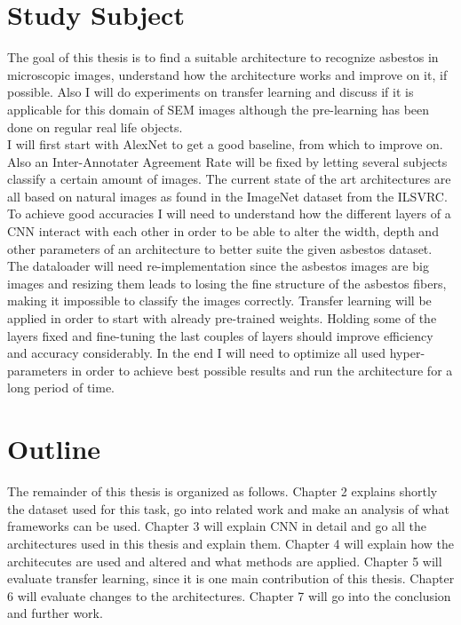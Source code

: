 \section{Study Subject}

The goal of this thesis is to find a suitable architecture to recognize asbestos in microscopic images, understand how the architecture works and improve on it, if possible. Also I will do experiments on transfer learning and discuss if it is applicable for this domain of SEM images although the pre-learning has been done on regular real life objects. \\

I will first start with AlexNet to get a good baseline, from which to improve on. Also an Inter-Annotater Agreement Rate will be fixed by letting several subjects classify a certain amount of images. The current state of the art architectures are all based on natural images as found in the ImageNet dataset from the ILSVRC. To achieve good accuracies I will need to understand how the different layers of a CNN interact with each other in order to be able to alter the width, depth and other parameters of an architecture to better suite the given asbestos dataset. The dataloader will need re-implementation since the asbestos images are big images and resizing them leads to losing the fine structure of the asbestos fibers, making it impossible to classify the images correctly. Transfer learning will be applied in order to start with already pre-trained weights. Holding some of the layers fixed and fine-tuning the last couples of layers should improve efficiency and accuracy considerably. In the end I will need to optimize all used hyper-parameters in order to achieve best possible results and run the architecture for a long period of time.

\section{Outline}

The remainder of this thesis is organized as follows. Chapter 2 explains shortly the dataset used for this task, go into related work and make an analysis of what frameworks can be used. Chapter 3 will explain CNN in detail and go  all the architectures used in this thesis and explain them. Chapter 4 will explain how the architecutes are used and altered and what methods are applied. Chapter 5 will evaluate transfer learning, since it is one main contribution of this thesis. Chapter 6 will evaluate changes to the architectures. Chapter 7 will go into the conclusion and further work.
